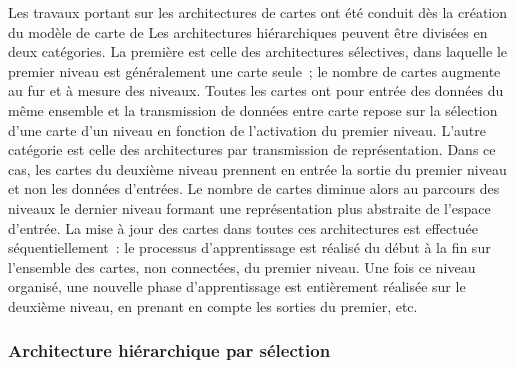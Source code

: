 \documentclass[../main]{subfiles}
\begin{document}
Les travaux portant sur les architectures de cartes ont été conduit dès la création du modèle de carte de
Les architectures hiérarchiques peuvent être divisées en deux catégories. La première est celle des architectures sélectives, dans laquelle le premier niveau est généralement une carte seule~; le nombre de cartes augmente au fur et à mesure des niveaux. Toutes les cartes ont pour entrée des données du même ensemble et la transmission de données entre carte repose sur la sélection d'une carte d'un niveau en fonction de l'activation du premier niveau. L'autre catégorie est celle des architectures par transmission de représentation. Dans ce cas, les cartes du deuxième niveau prennent en entrée la sortie du premier niveau et non les données d'entrées. Le nombre de cartes diminue alors au parcours des niveaux le dernier niveau formant une représentation plus abstraite de l'espace d'entrée.
La mise à jour des cartes dans toutes ces architectures est effectuée séquentiellement~: le processus d'apprentissage est réalisé du début à la fin sur l'ensemble des cartes, non connectées, du premier niveau. Une fois ce niveau organisé, une nouvelle phase d'apprentissage est entièrement réalisée sur le deuxième niveau, en prenant en compte les sorties du premier, etc.


\subsubsection{Architecture hiérarchique par sélection}

\end{document}
